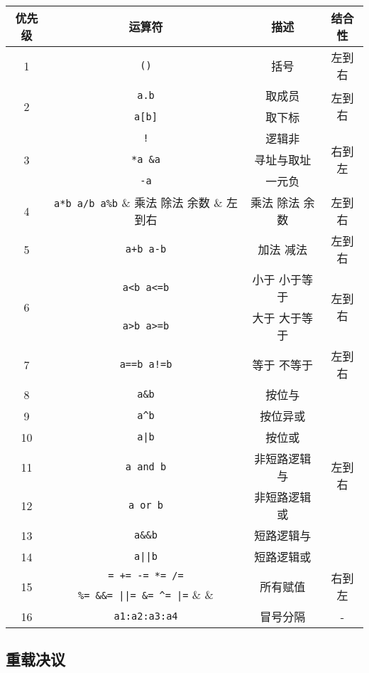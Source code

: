 \documentclass{article}
\begin{document}
\begin{table}[H]
	\centering
	\begin{tabular}{|c|c|c|c|}
		\hline
		优先级 & 运算符 & 描述 & 结合性 \\\hline
		1 & \verb|()| & 括号 & 左到右 \\\hline
		\multirow{2}{*}{2} & \verb|a.b| & 取成员 & \multirow{2}{*}{左到右} \\\cline{2-3}
		& \verb|a[b]| & 取下标 & \\\hline
		\multirow{3}{*}{3} & \verb|!| & 逻辑非 & \multirow{3}{*}{右到左}\\\cline{2-3}
		& \verb|*a &a| & 寻址与取址 & \\\cline{2-3}
		& \verb|-a| & 一元负 & \\\hline
		4 & \verb|a*b a/b a%b| & 乘法 除法 余数 & 左到右 \\\hline
		5 & \verb|a+b a-b| & 加法 减法 & 左到右 \\\hline
		\multirow{2}{*}{6} & \verb|a<b a<=b| & 小于 小于等于 & \multirow{2}{*}{左到右} \\\cline{2-3}
		& \verb|a>b a>=b| & 大于 大于等于 & \\\hline
		7 & \verb|a==b a!=b| & 等于 不等于 & 左到右 \\\hline
		8 & \verb|a&b| & 按位与 & \multirow{7}{*}{左到右} \\\cline{1-3}
		9 & \verb|a^b| & 按位异或 & \\\cline{1-3}
		10 & \verb&a|b& & 按位或 & \\\cline{1-3}
		11 & \verb|a and b| & 非短路逻辑与 & \\\cline{1-3}
		12 & \verb|a or b| & 非短路逻辑或 & \\\cline{1-3}
		13 & \verb|a&&b| & 短路逻辑与 & \\\cline{1-3}
		14 & \verb&a||b& & 短路逻辑或 & \\\hline
		\multirow{2}{*}{15} & \verb|= += -= *= /=| & \multirow{2}{*}{所有赋值} & \multirow{2}{*}{右到左} \\\cline{2}
		& \verb"%= &&= ||= &= ^= |=" &  & \\\hline
		16 & \verb|a1:a2:a3:a4| & 冒号分隔 & - \\\hline
	\end{tabular}
\end{table}

\subsection{重载决议}
\label{chongzai}
\end{document}

